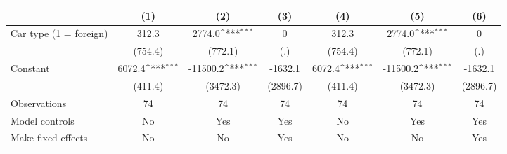 {
\def\sym#1{\ifmmode^{#1}\else\(^{#1}\)\fi}
\begin{tabular}{l*{6}{c}}
\hline\hline
                &\multicolumn{1}{c}{(1)}         &\multicolumn{1}{c}{(2)}         &\multicolumn{1}{c}{(3)}         &\multicolumn{1}{c}{(4)}         &\multicolumn{1}{c}{(5)}         &\multicolumn{1}{c}{(6)}         \\
\hline
Car type (1 = foreign)&    312.3         &   2774.0\sym{***}&        0         &    312.3         &   2774.0\sym{***}&        0         \\
                &  (754.4)         &  (772.1)         &      (.)         &  (754.4)         &  (772.1)         &      (.)         \\
[1em]
Constant        &   6072.4\sym{***}& -11500.2\sym{***}&  -1632.1         &   6072.4\sym{***}& -11500.2\sym{***}&  -1632.1         \\
                &  (411.4)         & (3472.3)         & (2896.7)         &  (411.4)         & (3472.3)         & (2896.7)         \\
\hline
Observations    &       74         &       74         &       74         &       74         &       74         &       74         \\
Model controls  &       No         &      Yes         &      Yes         &       No         &      Yes         &      Yes         \\
Make fixed effects&       No         &       No         &      Yes         &       No         &       No         &      Yes         \\
\hline\hline \end{tabular}} \begin{tablenotes} \footnotesize \item \lipsum[1] \end{tablenotes}
